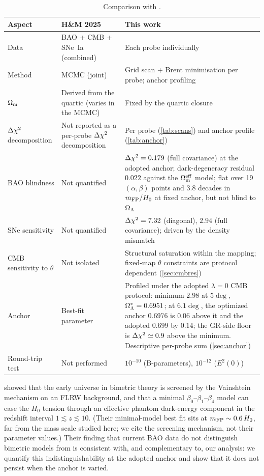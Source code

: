 \begin{table}[t]
\centering\small
\caption{Comparison with \citet{Hogas2025}.}\label{tab:compare}
\begin{tabularx}{\textwidth}{@{}l>{\raggedright\arraybackslash}p{4.0cm}>{\raggedright\arraybackslash}X@{}}
\toprule
Aspect & H\&M 2025 & This work\\
\midrule
Data & BAO + CMB + SNe~Ia (combined) & Each probe individually\\
Method & MCMC (joint) & Grid scan + Brent minimisation per probe; anchor profiling\\
$\Omega_{\mathrm m}$ & Derived from the quartic (varies in the MCMC) & Fixed by the quartic closure\\
$\Delta\chi^2$ decomposition & Not reported as a per-probe $\Delta\chi^2$ decomposition & Per probe (\cref{tab:scans}) and anchor profile (\cref{tab:anchor})\\
BAO blindness & Not quantified & $\Delta\chi^2=0.179$ (full covariance) at the adopted anchor; dark-degeneracy residual $0.022$ against the $\Omega_{\mathrm m}^{\rm eff}$ model; flat over 19 $(\alpha,\beta)$ points and 3.8 decades in $m_{\mathrm{FP}}/H_0$ at fixed anchor, but not blind to $\Omega_{\Lambda}$\\
SNe sensitivity & Not quantified & $\Delta\chi^2=7.32$ (diagonal), $2.94$ (full covariance); driven by the density mismatch\\
CMB sensitivity to $\theta$ & Not isolated & Structural saturation within the mapping; fixed-map $\theta$ constraints are protocol dependent (\cref{sec:cmbres})\\
Anchor & Best-fit parameter & Profiled under the adopted $\lambda=0$ CMB protocol: minimum $2.98$ at $5\deg$, $\Omega_{\Lambda}^*=0.6951$; at $6.1\deg$, the optimized anchor $0.6976$ is $0.06$ above it and the adopted $0.699$ by $0.14$; the GR-side floor is $\Delta\chi^2\simeq0.9$ above the minimum. Descriptive per-probe sum (\cref{sec:anchor})\\
Round-trip test & Not performed & $10^{-10}$ (B-parameters), $10^{-12}$ ($E^2(0)$)\\
\bottomrule
\end{tabularx}
\end{table}

\citet{Luben2020} showed that the early universe in bimetric theory is screened by the Vainshtein mechanism on an FLRW background, and that a minimal $\beta_0$--$\beta_1$--$\beta_4$ model can ease the $H_0$ tension through an effective phantom dark-energy component in the redshift interval $1\lesssim z\lesssim10$. (Their minimal-model best fit sits at $m_{\mathrm{FP}}\sim0.6\,H_0$, far from the mass scale studied here; we cite the screening mechanism, not their parameter values.) Their finding that current BAO data do not distinguish bimetric models from \LCDM{} is consistent with, and complementary to, our analysis: we quantify this indistinguishability at the adopted anchor and show that it does not persist when the anchor is varied.
